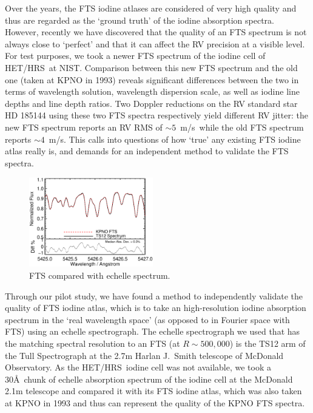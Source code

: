 \documentclass[12pt]{article}
\def\mps{m/s}
\def\hrs{HET/HRS}
\begin{document}
Over the years, the FTS iodine atlases are considered of very high
quality and thus are regarded as the `ground truth' of the iodine
absorption spectra. However, recently we have discovered that the
quality of an FTS spectrum is not always close to `perfect' and that
it can affect the RV precision at a visible level. For test purposes,
we took a newer FTS spectrum of the iodine cell of \hrs\ at
NIST. Comparison between this new FTS spectrum and the old one (taken
at KPNO in 1993) reveals significant differences between the two in
terms of wavelength solution, wavelength dispersion scale, as well as
iodine line depths and line depth ratios. Two Doppler reductions on
the RV standard star HD 185144 using these two FTS spectra
respectively yield different RV jitter: the new FTS spectrum reports
an RV RMS of $\sim5$~\mps\ while the old FTS spectrum reports
$\sim4$~\mps. This calls into questions of how `true' any existing FTS
iodine atlas really is, and demands for an independent method to
validate the FTS spectra.

\begin{figure}
  \vspace{-35pt}
  \begin{center}
    \includegraphics[width=0.48\textwidth]{fts}
  \end{center}
  \vspace{-25pt}  
  \caption{FTS compared with echelle spectrum.}
  \vspace{-8pt}  
  \label{fig:fts}
\end{figure}

Through our pilot study, we have found a method to independently
validate the quality of FTS iodine atlas, which is to take an
high-resolution iodine absorption spectrum in the `real wavelength
space' (as opposed to in Fourier space with FTS) using an echelle
spectrograph. The echelle spectrograph we used that has
the matching spectral resolution to an FTS (at $R \sim 500,000$) is
the TS12 arm of the Tull Spectrograph at the 2.7m Harlan J.~Smith
telescope of McDonald Observatory. As the \hrs\ iodine cell was not
available, we took a 30\AA\ chunk of echelle absorption spectrum of
the iodine cell at the McDonald 2.1m telescope and compared it with
its FTS iodine atlas, which was also taken at KPNO in 1993 and thus
can represent the quality of the KPNO FTS spectra. 
\end{document}
